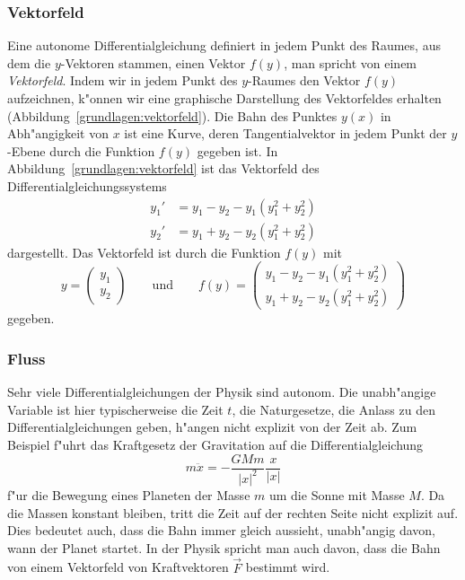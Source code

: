\subsubsection{Vektorfeld}
Eine autonome Differentialgleichung definiert in jedem Punkt des
Raumes, aus dem die $y$-Vektoren stammen, einen Vektor $f(y)$,
man spricht von einem {\em Vektorfeld}.
%
Indem wir in jedem Punkt des $y$-Raumes den Vektor $f(y)$ aufzeichnen,
k"onnen wir eine graphische Darstellung des Vektorfeldes erhalten
(Abbildung~\ref{grundlagen:vektorfeld}).
Die Bahn des Punktes $y(x)$ in Abh"angigkeit von $x$ ist eine Kurve,
deren Tangentialvektor in jedem Punkt der $y$-Ebene durch die Funktion
$f(y)$ gegeben ist.
In Abbildung~\ref{grundlagen:vektorfeld} ist das Vektorfeld des
Differentialgleichungssystems
\begin{equation}
\begin{aligned}
y_1'&=y_1-y_2-y_1(y_1^2+y_2^2)\\
y_2'&=y_1+y_2-y_2(y_1^2+y_2^2)
\end{aligned}
\label{grundlagen:hopfsystem}
\end{equation}
dargestellt.
Das Vektorfeld ist durch die Funktion $f(y)$ mit
\[
y=\begin{pmatrix}y_1\\y_2\end{pmatrix}
\qquad\text{und}\qquad
f(y)=\begin{pmatrix}
y_1-y_2-y_1(y_1^2+y_2^2)\\
y_1+y_2-y_2(y_1^2+y_2^2)
\end{pmatrix}
\]
gegeben.

\subsubsection{Fluss}
Sehr viele Differentialgleichungen der Physik sind autonom.
Die unabh"angige Variable ist hier typischerweise die Zeit $t$, die
Naturgesetze, die Anlass zu den Differentialgleichungen geben,
h"angen nicht explizit von der Zeit ab. 
Zum Beispiel f"uhrt das Kraftgesetz der Gravitation auf die
Differentialgleichung
\[
m\ddot x=-\frac{GMm}{|x|^2}\frac{x}{|x|}
\]
f"ur die Bewegung eines Planeten der Masse $m$ um die Sonne mit Masse $M$.
Da die Massen konstant bleiben, tritt die Zeit auf der rechten Seite nicht
explizit auf.
Dies bedeutet auch, dass die Bahn immer gleich aussieht, unabh"angig
davon, wann der Planet startet.
In der Physik spricht man auch davon, dass die Bahn von einem 
Vektorfeld von Kraftvektoren $\vec F$ bestimmt wird.

